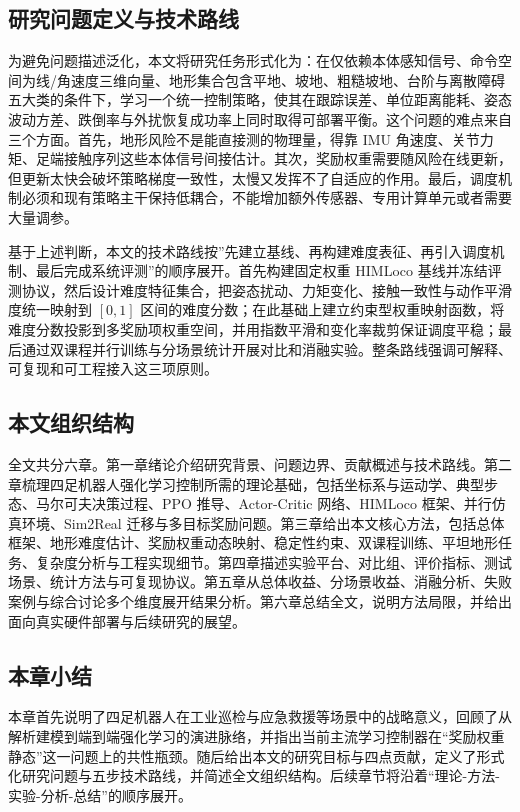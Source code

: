 \documentclass[12pt,a4paper]{ctexart}
\numberwithin{equation}{section}
\numberwithin{table}{section}
\numberwithin{figure}{section}
\begin{document}
\subsection{研究问题定义与技术路线}
为避免问题描述泛化，本文将研究任务形式化为：在仅依赖本体感知信号、命令空间为线/角速度三维向量、地形集合包含平地、坡地、粗糙坡地、台阶与离散障碍五大类的条件下，学习一个统一控制策略，使其在跟踪误差、单位距离能耗、姿态波动方差、跌倒率与外扰恢复成功率上同时取得可部署平衡。这个问题的难点来自三个方面。首先，地形风险不是能直接测的物理量，得靠 IMU 角速度、关节力矩、足端接触序列这些本体信号间接估计。其次，奖励权重需要随风险在线更新，但更新太快会破坏策略梯度一致性，太慢又发挥不了自适应的作用。最后，调度机制必须和现有策略主干保持低耦合，不能增加额外传感器、专用计算单元或者需要大量调参。

基于上述判断，本文的技术路线按”先建立基线、再构建难度表征、再引入调度机制、最后完成系统评测”的顺序展开。首先构建固定权重 HIMLoco 基线并冻结评测协议，然后设计难度特征集合，把姿态扰动、力矩变化、接触一致性与动作平滑度统一映射到 $[0,1]$ 区间的难度分数；在此基础上建立约束型权重映射函数，将难度分数投影到多奖励项权重空间，并用指数平滑和变化率裁剪保证调度平稳；最后通过双课程并行训练与分场景统计开展对比和消融实验。整条路线强调可解释、可复现和可工程接入这三项原则。

\subsection{本文组织结构}
全文共分六章。第一章绪论介绍研究背景、问题边界、贡献概述与技术路线。第二章梳理四足机器人强化学习控制所需的理论基础，包括坐标系与运动学、典型步态、马尔可夫决策过程、PPO 推导、Actor-Critic 网络、HIMLoco 框架、并行仿真环境、Sim2Real 迁移与多目标奖励问题。第三章给出本文核心方法，包括总体框架、地形难度估计、奖励权重动态映射、稳定性约束、双课程训练、平坦地形任务、复杂度分析与工程实现细节。第四章描述实验平台、对比组、评价指标、测试场景、统计方法与可复现协议。第五章从总体收益、分场景收益、消融分析、失败案例与综合讨论多个维度展开结果分析。第六章总结全文，说明方法局限，并给出面向真实硬件部署与后续研究的展望。

\subsection{本章小结}
本章首先说明了四足机器人在工业巡检与应急救援等场景中的战略意义，回顾了从解析建模到端到端强化学习的演进脉络，并指出当前主流学习控制器在“奖励权重静态”这一问题上的共性瓶颈。随后给出本文的研究目标与四点贡献，定义了形式化研究问题与五步技术路线，并简述全文组织结构。后续章节将沿着“理论-方法-实验-分析-总结”的顺序展开。
\end{document}
